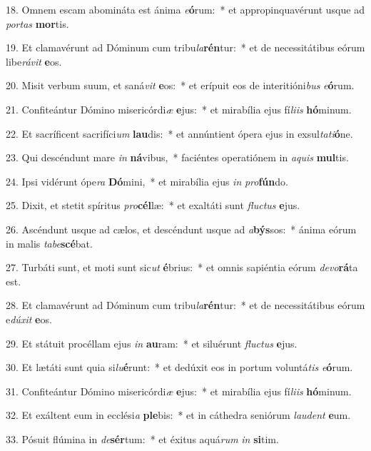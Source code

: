 18. Omnem escam abomináta est ánima \textit{e}\textbf{ó}rum:~*  et appropinquavérunt usque ad \textit{por}\textit{tas} \textbf{mor}tis.\

19. Et clamavérunt ad Dóminum cum tribu\textit{la}\textbf{rén}tur:~*  et de necessitátibus eórum libe\textit{rá}\textit{vit} \textbf{e}os.\

20. Misit verbum suum, et saná\textit{vit} \textbf{e}os:~*  et erípuit eos de interitióni\textit{bus} \textit{e}\textbf{ó}rum.\

21. Confiteántur Dómino misericórdi\textit{æ} \textbf{e}jus:~*  et mirabília ejus fí\textit{li}\textit{is} \textbf{hó}minum.\

22. Et sacríficent sacrifíci\textit{um} \textbf{lau}dis:~*  et annúntient ópera ejus in exsul\textit{ta}\textit{ti}\textbf{ó}ne.\

23. Qui descéndunt mare \textit{in} \textbf{ná}vibus,~*  faciéntes operatiónem in \textit{a}\textit{quis} \textbf{mul}tis.\

24. Ipsi vidérunt ópe\textit{ra} \textbf{Dó}mini,~*  et mirabília ejus \textit{in} \textit{pro}\textbf{fún}do.\

25. Dixit, et stetit spíritus \textit{pro}\textbf{cél}læ:~*  et exaltáti sunt \textit{fluc}\textit{tus} \textbf{e}jus.\

26. Ascéndunt usque ad cælos, et descéndunt usque ad \textit{a}\textbf{býs}sos:~*  ánima eórum in malis \textit{ta}\textit{be}\textbf{scé}bat.\

27. Turbáti sunt, et moti sunt sic\textit{ut} \textbf{é}brius:~*  et omnis sapiéntia eórum \textit{de}\textit{vo}\textbf{rá}ta est.\

28. Et clamavérunt ad Dóminum cum tribu\textit{la}\textbf{rén}tur:~*  et de necessitátibus eórum e\textit{dú}\textit{xit} \textbf{e}os.\

29. Et státuit procéllam ejus \textit{in} \textbf{au}ram:~*  et siluérunt \textit{fluc}\textit{tus} \textbf{e}jus.\

30. Et lætáti sunt quia si\textit{lu}\textbf{é}runt:~*  et dedúxit eos in portum voluntá\textit{tis} \textit{e}\textbf{ó}rum.\

31. Confiteántur Dómino misericórdi\textit{æ} \textbf{e}jus:~*  et mirabília ejus fí\textit{li}\textit{is} \textbf{hó}minum.\

32. Et exáltent eum in ecclési\textit{a} \textbf{ple}bis:~*  et in cáthedra seniórum \textit{lau}\textit{dent} \textbf{e}um.\

33. Pósuit flúmina in \textit{de}\textbf{sér}tum:~*  et éxitus aquá\textit{rum} \textit{in} \textbf{si}tim.\

